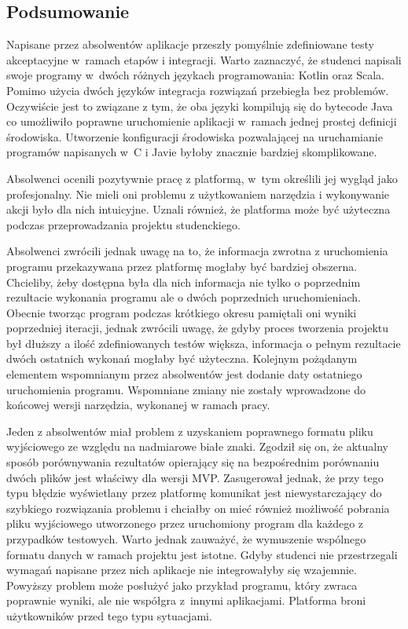 \subsection{Podsumowanie}

Napisane przez absolwentów aplikacje przeszły pomyślnie zdefiniowane testy akceptacyjne w~ramach etapów i integracji.
Warto zaznaczyć, że studenci napisali swoje programy w~dwóch różnych językach programowania: Kotlin oraz Scala.
Pomimo użycia dwóch języków integracja rozwiązań przebiegła bez problemów.
Oczywiście jest to związane z tym, że oba języki kompilują się do bytecode Java co umożliwiło poprawne uruchomienie aplikacji w~ramach jednej prostej definicji środowiska.
Utworzenie konfiguracji środowiska pozwalającej na uruchamianie programów napisanych w~C i Javie byłoby znacznie bardziej skomplikowane.

Absolwenci ocenili pozytywnie pracę z platformą, w~tym określili jej wygląd jako profesjonalny.
Nie mieli oni problemu z użytkowaniem narzędzia i wykonywanie akcji było dla nich intuicyjne.
Uznali również, że platforma może być użyteczna podczas przeprowadzania projektu studenckiego.

Absolwenci zwrócili jednak uwagę na to, że informacja zwrotna z uruchomienia programu przekazywana przez platformę mogłaby być bardziej obszerna.
Chcieliby, żeby dostępna była dla nich informacja nie tylko o poprzednim rezultacie wykonania programu ale o dwóch poprzednich uruchomieniach.
Obecnie tworząc program podczas krótkiego okresu pamiętali oni wyniki poprzedniej iteracji, jednak zwrócili uwagę, że gdyby proces tworzenia projektu był dłuższy a ilość zdefiniowanych testów większa, informacja o pełnym rezultacie dwóch ostatnich wykonań mogłaby być użyteczna.
Kolejnym pożądanym elementem wspomnianym przez absolwentów jest dodanie daty ostatniego uruchomienia programu.
Wspomniane zmiany nie zostały wprowadzone do końcowej wersji narzędzia, wykonanej w ramach pracy.

Jeden z absolwentów miał problem z uzyskaniem poprawnego formatu pliku wyjściowego ze względu na nadmiarowe białe znaki.
Zgodził się on, że aktualny sposób porównywania rezultatów opierający się na bezpośrednim porównaniu dwóch plików jest właściwy dla wersji MVP.
Zasugerował jednak, że przy tego typu błędzie wyświetlany przez platformę komunikat jest niewystarczający do szybkiego rozwiązania problemu i chciałby on mieć również możliwość pobrania pliku wyjściowego utworzonego przez uruchomiony program dla każdego z przypadków testowych.
Warto jednak zauważyć, że wymuszenie wspólnego formatu danych w ramach projektu jest istotne.
Gdyby studenci nie przestrzegali wymagań napisane przez nich aplikacje nie integrowałyby się wzajemnie.
Powyższy problem może posłużyć jako przykład programu, który zwraca poprawnie wyniki, ale nie współgra z~innymi aplikacjami.
Platforma broni użytkowników przed tego typu sytuacjami.

